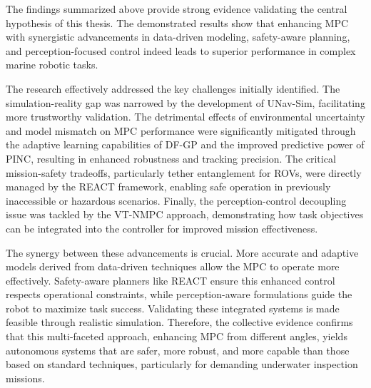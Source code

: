 \label{sec:analysis_results}

The findings summarized above provide strong evidence validating the central hypothesis of this thesis. The demonstrated results show that enhancing \ac{MPC} with synergistic advancements in data-driven modeling, safety-aware planning, and perception-focused control indeed leads to superior performance in complex marine robotic tasks.

The research effectively addressed the key challenges initially identified. The simulation-reality gap was narrowed by the development of UNav-Sim, facilitating more trustworthy validation. The detrimental effects of environmental uncertainty and model mismatch on \ac{MPC} performance were significantly mitigated through the adaptive learning capabilities of DF-GP and the improved predictive power of PINC, resulting in enhanced robustness and tracking precision. The critical mission-safety tradeoffs, particularly tether entanglement for \acp{ROV}, were directly managed by the REACT framework, enabling safe operation in previously inaccessible or hazardous scenarios. Finally, the perception-control decoupling issue was tackled by the VT-NMPC approach, demonstrating how task objectives can be integrated into the controller for improved mission effectiveness.

The synergy between these advancements is crucial. More accurate and adaptive models derived from data-driven techniques allow the \ac{MPC} to operate more effectively. Safety-aware planners like REACT ensure this enhanced control respects operational constraints, while perception-aware formulations guide the robot to maximize task success. Validating these integrated systems is made feasible through realistic simulation. Therefore, the collective evidence confirms that this multi-faceted approach, enhancing \ac{MPC} from different angles, yields autonomous systems that are safer, more robust, and more capable than those based on standard techniques, particularly for demanding underwater inspection missions.

